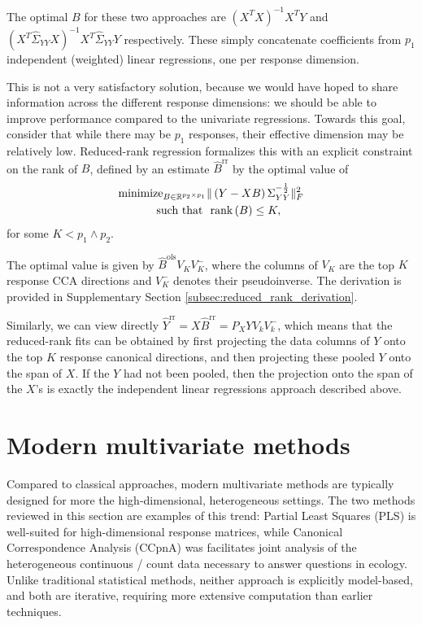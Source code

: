 \documentclass{article}
\begin{document}
The optimal $B$ for these two approaches are $\left(X^{T}X\right)^{-1}X^{T}Y$
and $\left(X^{T}\hat{\Sigma}_{YY} X\right)^{-1}X^{T}\hat{\Sigma}_{YY}Y$
respectively. These simply concatenate coefficients from $p_{1}$ independent
(weighted) linear regressions, one per response dimension.

This is not a very satisfactory solution, because we would have hoped to share
information across the different response dimensions: we should be able to
improve performance compared to the univariate regressions. Towards this goal,
consider that while there may be $p_{1}$ responses, their effective dimension
may be relatively low. Reduced-rank regression formalizes this with an explicit
constraint on the rank of $B$, defined by an estimate $\hat{B}^{\text{rr}}$ by
the optimal value of
\begin{align}
\text{minimize}_{B \in \mathbb{R}^{p_{2} \times p_{1}}} &\|\left(Y - XB\right)\Sigma_{YY}^{-\frac{1}{2}}\|_{F}^{2} \label{eq:rr_obj}\\
\text{such that } &\text{ rank}\left(B\right) \leq K, \nonumber
\end{align}
for some $K < p_{1}\wedge p_{2}$.

The optimal value is given by $\hat{B}^{\text{ols}}V_{K}V_{K}^{-}$, where the
columns of $V_{K}$ are the top $K$ response CCA directions and $V_{K}^{-}$
denotes their pseudoinverse. The derivation is provided in Supplementary Section
\ref{subsec:reduced_rank_derivation}.

Similarly, we can view directly $\hat{Y}^{\text{rr}} = X\hat{B}^{\text{rr}} =
P_{X}YV_{k}V_{k}^{-}$, which means that the reduced-rank fits can be obtained by
first projecting the data columns of $Y$ onto the top $K$ response canonical
directions, and then projecting these pooled $Y$ onto the span of $X$. If the
$Y$ had not been pooled, then the projection onto the span of the $X$'s is
exactly the independent linear regressions approach described above.

\section{Modern multivariate methods}

Compared to classical approaches, modern multivariate methods are typically
designed for more the high-dimensional, heterogeneous settings. The two methods
reviewed in this section are examples of this trend: Partial Least Squares (PLS)
is well-suited for high-dimensional response matrices, while Canonical
Correspondence Analysis (CCpnA) was facilitates joint analysis of the
heterogeneous continuous / count data necessary to answer questions in ecology.
Unlike traditional statistical methods, neither approach is explicitly
model-based, and both are iterative, requiring more extensive computation than
earlier techniques.
\end{document}
